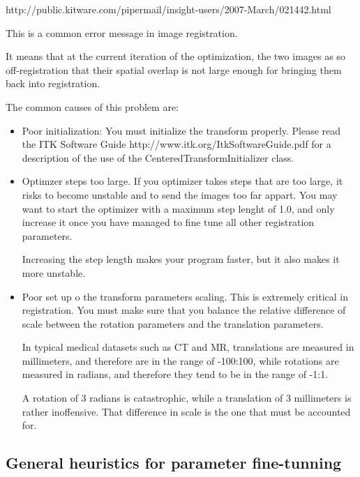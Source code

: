 http://public.kitware.com/pipermail/insight-users/2007-March/021442.html

This is a common error message in image registration.

It means that at the current iteration of the optimization,
the two images as so off-registration that their spatial
overlap is not large enough for bringing them back into
registration.

The common causes of this problem are:

\begin{itemize}
\item Poor initialization:    You must initialize the transform properly.
Please read the ITK Software Guide http://www.itk.org/ItkSoftwareGuide.pdf  for
a description of the use of the CenteredTransformInitializer class.
\item Optimzer steps too large. If you optimizer takes steps that are too
large, it risks to become unstable and to send the images too far appart.  You
may want to start the optimizer with a maximum step lenght of 1.0, and only
increase it once you have managed to fine tune all other registration
parameters.

Increasing the step length makes your program faster, but it also makes it more
unstable.



\item Poor set up o the transform parameters scaling.  This is extremely
critical in registration. You must make sure that you balance the relative
difference of scale between the rotation parameters and the translation
parameters.

In typical medical datasets such as CT and MR, translations are measured in
millimeters, and therefore are in the range of -100:100, while rotations are
measured in radians, and therefore they tend to be in the range of   -1:1.


A rotation of 3 radians is catastrophic, while a translation of 3 millimeters
is rather inoffensive.  That difference in scale is the one that must be
accounted for.
\end{itemize}



\subsection{General heuristics for parameter fine-tunning}






